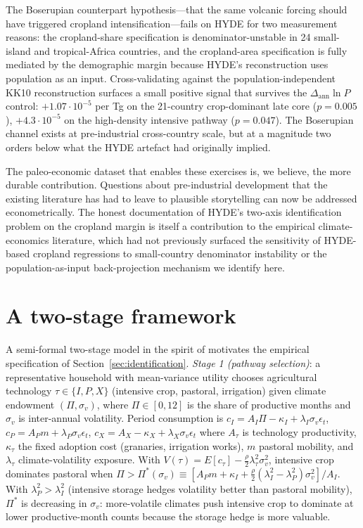 \documentclass[11pt,letterpaper]{article}
\begin{document}
The Boserupian counterpart hypothesis---that the same volcanic forcing should have triggered cropland intensification---fails on HYDE for two measurement reasons: the cropland-share specification is denominator-unstable in 24 small-island and tropical-Africa countries, and the cropland-area specification is fully mediated by the demographic margin because HYDE's reconstruction uses population as an input. Cross-validating against the population-independent KK10 reconstruction \citep{kaplan2011} surfaces a small positive signal that survives the $\Delta_{\text{ann}} \ln P$ control: $+1.07\!\cdot\!10^{-5}$ per Tg on the 21-country crop-dominant late core ($p=0.005$), $+4.3\!\cdot\!10^{-5}$ on the high-density intensive pathway ($p=0.047$). The Boserupian channel exists at pre-industrial cross-country scale, but at a magnitude two orders below what the HYDE artefact had originally implied.

The paleo-economic dataset that enables these exercises is, we believe, the more durable contribution. Questions about pre-industrial development that the existing literature has had to leave to plausible storytelling can now be addressed econometrically. The honest documentation of HYDE's two-axis identification problem on the cropland margin is itself a contribution to the empirical climate-economics literature, which had not previously surfaced the sensitivity of HYDE-based cropland regressions to small-country denominator instability or the population-as-input back-projection mechanism we identify here.

\appendix

\section{A two-stage framework}
\label{app:theory}

A semi-formal two-stage model in the spirit of \citet{ashraf2011dynamics} motivates the empirical specification of Section~\ref{sec:identification}. \emph{Stage 1 (pathway selection)}: a representative household with mean-variance utility chooses agricultural technology $\tau \in \{I, P, X\}$ (intensive crop, pastoral, irrigation) given climate endowment $(\Pi, \sigma_v)$, where $\Pi \in [0, 12]$ is the share of productive months and $\sigma_v$ is inter-annual volatility. Period consumption is $c_I = A_I \Pi - \kappa_I + \lambda_I \sigma_v \epsilon_t$, $c_P = A_P m + \lambda_P \sigma_v \epsilon_t$, $c_X = A_X - \kappa_X + \lambda_X \sigma_v \epsilon_t$ where $A_\tau$ is technology productivity, $\kappa_\tau$ the fixed adoption cost (granaries, irrigation works), $m$ pastoral mobility, and $\lambda_\tau$ climate-volatility exposure. With $V(\tau) = E[c_\tau] - \tfrac{\rho}{2}\lambda_\tau^2 \sigma_v^2$, intensive crop dominates pastoral when $\Pi > \Pi^*(\sigma_v) \equiv [A_P m + \kappa_I + \tfrac{\rho}{2}(\lambda_I^2 - \lambda_P^2)\sigma_v^2]/A_I$. With $\lambda_P^2 > \lambda_I^2$ (intensive storage hedges volatility better than pastoral mobility), $\Pi^*$ is decreasing in $\sigma_v$: more-volatile climates push intensive crop to dominate at lower productive-month counts because the storage hedge is more valuable.
\end{document}
